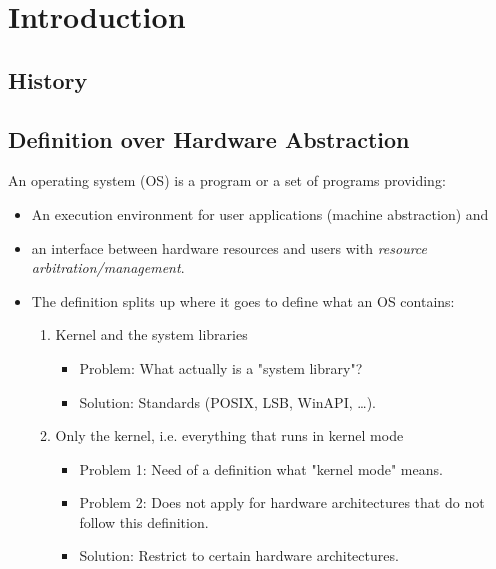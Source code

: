 \chapter{Introduction}
	\section{History} %

	\section{Definition over Hardware Abstraction}
		An operating system (OS) is a program or a set of programs providing:
		\begin{itemize}
			\item An execution environment for user applications (machine abstraction) and
			\item an interface between hardware resources and users with \textit{resource arbitration/management}.
			\item The definition splits up where it goes to define what an OS contains:
				\begin{enumerate}
					\item Kernel and the system libraries
						\begin{itemize}
							\item Problem: What actually is a "system library"?
							\item Solution: Standards (POSIX, LSB, WinAPI, \dots).
						\end{itemize}
					\item Only the kernel, i.e. everything that runs in kernel mode
						\begin{itemize}
							\item Problem 1: Need of a definition what "kernel mode" means.
							\item Problem 2: Does not apply for hardware architectures that do not follow this definition.
							\item Solution: Restrict to certain hardware architectures.
						\end{itemize}
				\end{enumerate}
		\end{itemize}

